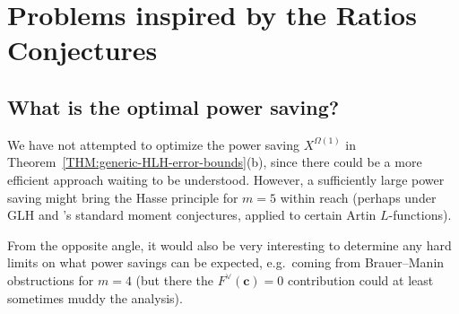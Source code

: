 \documentclass[12pt]{report}
\begin{document}

\section{Problems inspired by the Ratios Conjectures}
\label{SEC:speculation-on-other-Diophantine-problems}

\subsection{What is the optimal power saving?}

We have not attempted to optimize
the power saving $X^{\Omega(1)}$ in Theorem~\ref{THM:generic-HLH-error-bounds}(b),
since there could be a more efficient approach waiting to be understood.
However,
a sufficiently large power saving might bring the Hasse principle for $m=5$ within reach
(perhaps under GLH and \cite{conrey2005integral}'s standard moment conjectures,
applied to certain Artin $L$-functions).

From the opposite angle,
it would also be very interesting to determine any hard limits on what power savings can be expected,
e.g.~coming from Brauer--Manin obstructions for $m=4$
(but there the $F^\vee(\bm{c})=0$ contribution could at least sometimes muddy the analysis).

\end{document}

